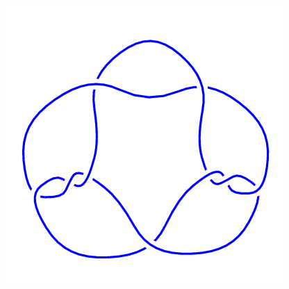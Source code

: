 \begin{figure}[H]
\begin{minipage}[b]{.18\linewidth}
	\end{minipage}
	\begin{minipage}[b]{.18\linewidth}
		\centering
		\includegraphics[width=\linewidth]{../data/9_10.png}
	\end{minipage}
\end{figure}
